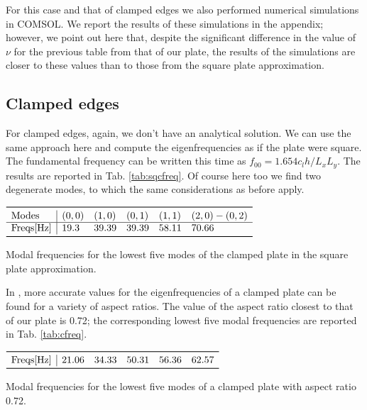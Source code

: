 \documentclass[a4paper]{article}
\begin{document}
For this case and that of clamped edges we also performed numerical simulations in COMSOL. We report the results of these simulations in the appendix; however, we point out here that, despite the significant difference in the value of $\nu$ for the previous table from that of our plate, the results of the simulations are closer to these values than to those from the square plate approximation.

\subsection{Clamped edges}

For clamped edges, again, we don't have an analytical solution. We can use the same approach here and compute the eigenfrequencies as if the plate were square. The fundamental frequency can be written this time as $f_{00} = 1.654c_l h / L_xL_y$. The results are reported in Tab. \ref{tab:sqcfreq}. Of course here too we find two degenerate modes, to which the same considerations as before apply.

\begin{table}[h]
	\centering
	$\begin{array}{l|lllll}
		\toprule
		\text{Modes} & (0,0) & (1,0) & (0,1) & (1,1) & (2,0) - (0,2) \\
		\hline
		\text{Freqs[Hz]} & 19.3 &  39.39 & 
		39.39 &  58.11  & 70.66	\\
		\bottomrule
	\end{array}$
	\caption{Modal frequencies for the lowest five modes of the clamped plate in the square plate approximation.}
	\label{tab:sqcfreq}
\end{table}

In \cite{leissa}, more accurate values for the eigenfrequencies of a clamped plate can be found for a variety of aspect ratios. The value of the aspect ratio closest to that of our plate is 0.72; the corresponding lowest five modal frequencies are reported in Tab. \ref{tab:cfreq}.

\begin{table}[h]
	\centering
	$\begin{array}{l|lllll}
		\toprule
		\text{Freqs[Hz]} & 21.06 & 34.33  & 
		50.31 &  56.36  & 62.57\\
		\bottomrule
	\end{array}$
	\caption{Modal frequencies for the lowest five modes of a clamped plate with aspect ratio 0.72.}
	\label{tab:cfreq}
\end{table}
\end{document}
